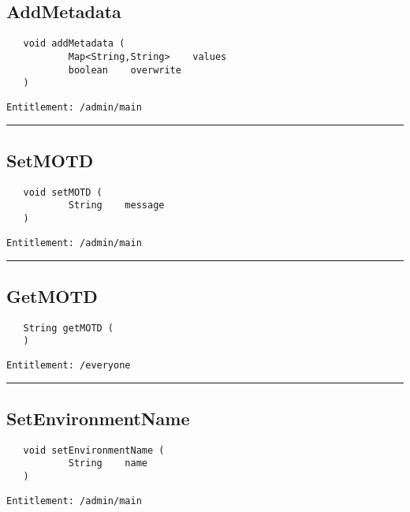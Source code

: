 \subsection{AddMetadata}
\label{Api:AddMetadata}
\begin{verbatim}
   void addMetadata (
           Map<String,String>    values
           boolean    overwrite
   )
\end{verbatim}
\begin{Verbatim}[fontsize=\small, formatcom=\color{Maroon}]
  Entitlement: /admin/main
\end{Verbatim}



\rule{12cm}{2pt}
\subsection{SetMOTD}
\label{Api:SetMOTD}
\begin{verbatim}
   void setMOTD (
           String    message
   )
\end{verbatim}
\begin{Verbatim}[fontsize=\small, formatcom=\color{Maroon}]
  Entitlement: /admin/main
\end{Verbatim}



\rule{12cm}{2pt}
\subsection{GetMOTD}
\label{Api:GetMOTD}
\begin{verbatim}
   String getMOTD (
   )
\end{verbatim}
\begin{Verbatim}[fontsize=\small, formatcom=\color{Maroon}]
  Entitlement: /everyone
\end{Verbatim}



\rule{12cm}{2pt}
\subsection{SetEnvironmentName}
\label{Api:SetEnvironmentName}
\begin{verbatim}
   void setEnvironmentName (
           String    name
   )
\end{verbatim}
\begin{Verbatim}[fontsize=\small, formatcom=\color{Maroon}]
  Entitlement: /admin/main
\end{Verbatim}



